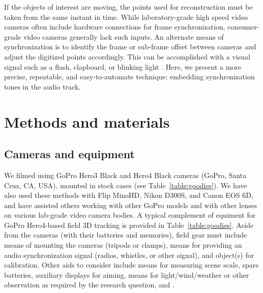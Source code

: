 \documentclass[fleqn,10pt]{wlpeerj}
\begin{document}
If the objects of interest are moving, the points used for reconstruction must be taken from the same instant in time.  While laboratory-grade high speed video cameras often include hardware connections for frame synchronization, consumer-grade video cameras generally lack such inputs. An alternate means of synchronization is to identify the frame or sub-frame offset between cameras and adjust the digitized points accordingly.  This can be accomplished with a visual signal such as a flash, clapboard, or blinking light \citep{citations}.  Here, we present a more precise, repeatable, and easy-to-automate technique: embedding synchronization tones in the audio track. %









\section*{Methods and materials}
\subsection*{Cameras and equipment}
We filmed using GoPro Hero3 Black and Hero4 Black cameras (GoPro, Santa Cruz, CA, USA), mounted in stock cases (see Table~\ref{table:goodies}).  We have also used these methods with Flip MinoHD, Nikon D300S, and Canon EOS 6D, and have assisted others working with other GoPro models and with other lenses on various lab-grade video camera bodies. A typical complement of equiment for GoPro Hero4-based field 3D tracking is provided in Table~\ref{table:goodies}.  Aside from the cameras (with their batteries and memories), field gear must include means of mounting the cameras (tripods or clamps), means for providing an audio synchronization signal (radios, whistles, or other signal), and object(s) for calibration.  Other aids to consider include means for measuring scene scale, spare batteries, auxiliary displays for aiming, means for light/wind/weather or other observation as required by the research question, and .
\end{document}
